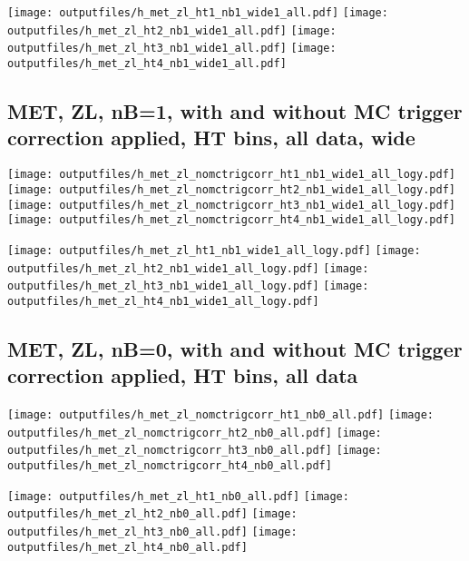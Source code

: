 \documentclass[11pt]{article}
\begin{document}
    \noindent
     \texttt{[image: outputfiles/h\_met\_zl\_ht1\_nb1\_wide1\_all.pdf]}
     \texttt{[image: outputfiles/h\_met\_zl\_ht2\_nb1\_wide1\_all.pdf]}
     \texttt{[image: outputfiles/h\_met\_zl\_ht3\_nb1\_wide1\_all.pdf]}
     \texttt{[image: outputfiles/h\_met\_zl\_ht4\_nb1\_wide1\_all.pdf]}

    \clearpage
     \subsection{ MET, ZL, nB=1, with and without MC trigger correction applied, HT bins, all data, wide}

    \noindent
     \texttt{[image: outputfiles/h\_met\_zl\_nomctrigcorr\_ht1\_nb1\_wide1\_all\_logy.pdf]}
     \texttt{[image: outputfiles/h\_met\_zl\_nomctrigcorr\_ht2\_nb1\_wide1\_all\_logy.pdf]}
     \texttt{[image: outputfiles/h\_met\_zl\_nomctrigcorr\_ht3\_nb1\_wide1\_all\_logy.pdf]}
     \texttt{[image: outputfiles/h\_met\_zl\_nomctrigcorr\_ht4\_nb1\_wide1\_all\_logy.pdf]}


    \noindent
     \texttt{[image: outputfiles/h\_met\_zl\_ht1\_nb1\_wide1\_all\_logy.pdf]}
     \texttt{[image: outputfiles/h\_met\_zl\_ht2\_nb1\_wide1\_all\_logy.pdf]}
     \texttt{[image: outputfiles/h\_met\_zl\_ht3\_nb1\_wide1\_all\_logy.pdf]}
     \texttt{[image: outputfiles/h\_met\_zl\_ht4\_nb1\_wide1\_all\_logy.pdf]}


    \clearpage
     \subsection{ MET, ZL, nB=0, with and without MC trigger correction applied, HT bins, all data}

    \noindent
     \texttt{[image: outputfiles/h\_met\_zl\_nomctrigcorr\_ht1\_nb0\_all.pdf]}
     \texttt{[image: outputfiles/h\_met\_zl\_nomctrigcorr\_ht2\_nb0\_all.pdf]}
     \texttt{[image: outputfiles/h\_met\_zl\_nomctrigcorr\_ht3\_nb0\_all.pdf]}
     \texttt{[image: outputfiles/h\_met\_zl\_nomctrigcorr\_ht4\_nb0\_all.pdf]}

    \noindent
     \texttt{[image: outputfiles/h\_met\_zl\_ht1\_nb0\_all.pdf]}
     \texttt{[image: outputfiles/h\_met\_zl\_ht2\_nb0\_all.pdf]}
     \texttt{[image: outputfiles/h\_met\_zl\_ht3\_nb0\_all.pdf]}
     \texttt{[image: outputfiles/h\_met\_zl\_ht4\_nb0\_all.pdf]}
\end{document}

